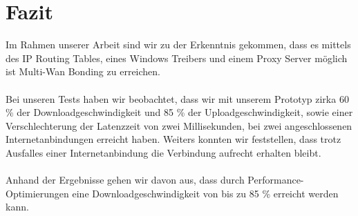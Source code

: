 \chapter{Fazit}
\label{cha:Fazit}

Im Rahmen unserer Arbeit sind wir zu der Erkenntnis gekommen, dass es mittels des IP Routing Tables, eines Windows Treibers und einem Proxy Server möglich ist Multi-Wan Bonding zu erreichen.
\\\\
Bei unseren Tests haben wir beobachtet, dass wir mit unserem Prototyp zirka 60 \% der Downloadgeschwindigkeit und 85 \% der Uploadgeschwindigkeit, sowie einer Verschlechterung der Latenzzeit von zwei Millisekunden, bei zwei angeschlossenen Internetanbindungen erreicht haben. Weiters konnten wir feststellen, dass trotz Ausfalles einer Internetanbindung die Verbindung aufrecht erhalten bleibt.
\\\\
Anhand der Ergebnisse gehen wir davon aus, dass durch Performance-Optimierungen eine Downloadgeschwindigkeit von bis zu 85 \% erreicht werden kann.

